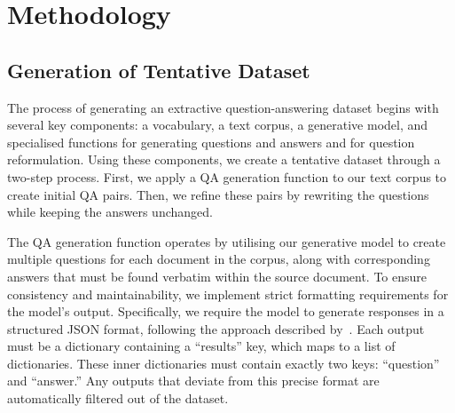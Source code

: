 \documentclass[11pt]{article}
\begin{document}
\section{Methodology}
\label{sec:methodology}

\subsection{Generation of Tentative Dataset}
\label{subsec:tentative_dataset}

The process of generating an extractive question-answering dataset begins with several
key components: a vocabulary, a text corpus, a generative model, and specialised
functions for generating questions and answers and for question reformulation. Using
these components, we create a tentative dataset through a two-step process. First, we
apply a QA generation function to our text corpus to create initial QA pairs. Then, we
refine these pairs by rewriting the questions while keeping the answers unchanged.

The QA generation function operates by utilising our generative model to create multiple
questions for each document in the corpus, along with corresponding answers that must be
found verbatim within the source document. To ensure consistency and maintainability, we
implement strict formatting requirements for the model's output. Specifically, we
require the model to generate responses in a structured JSON format, following the
approach described by~\citet{willard2023efficient}. Each output must be a dictionary
containing a ``results'' key, which maps to a list of dictionaries. These inner
dictionaries must contain exactly two keys: ``question'' and ``answer.'' Any outputs
that deviate from this precise format are automatically filtered out of the dataset.
\end{document}
